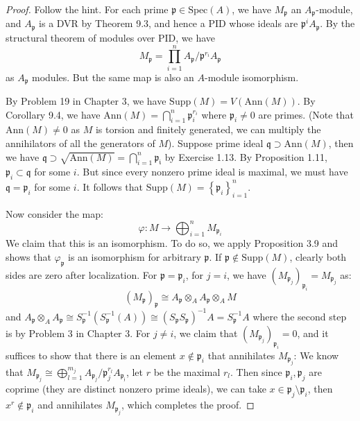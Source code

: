 \documentclass{solution}
\begin{document}
\begin{proof}
    Follow the hint. For each prime $\mathfrak{p} \in \mathrm{Spec}(A)$, we have $M_{\mathfrak{p}}$ an $A_{\mathfrak{p}}$-module, and $A_{\mathfrak{p}}$ is a DVR by Theorem 9.3, and hence a PID whose ideals are $\mathfrak{p}^i A_{\mathfrak{p}}$. By the structural theorem of modules over PID, we have
    $$M_{\mathfrak{p}} = \prod\limits_{i = 1}^{n} A_{\mathfrak{p}} / \mathfrak{p}^{r_i} A_{\mathfrak{p}}$$
    as $A_{\mathfrak{p}}$ modules. But the same map is also an $A$-module isomorphism.

    By Problem 19 in Chapter 3, we have $\mathrm{Supp}(M) = V(\mathrm{Ann}(M))$. By Corollary 9.4, we have $\mathrm{Ann}(M) = \bigcap\limits_{i = 1}^{n} \mathfrak{p}_i^{r_i}$ where $\mathfrak{p}_i \ne 0$ are primes. (Note that $\mathrm{Ann}(M) \ne 0$ as $M$ is torsion and finitely generated, we can multiply the annihilators of all the generators of $M$). Suppose prime ideal $\mathfrak{q} \supset \mathrm{Ann}(M)$, then we have $\mathfrak{q} \supset \sqrt{\mathrm{Ann}(M)} = \bigcap\limits_{i = 1}^{n} \mathfrak{p_i}$ by Exercise 1.13. By Proposition 1.11, $\mathfrak{p}_i \subset \mathfrak{q}$ for some $i$. But since every nonzero prime ideal is maximal, we must have $\mathfrak{q} = \mathfrak{p}_i$ for some $i$. It follows that $\mathrm{Supp}(M) = \left\lbrace \mathfrak{p}_i \right\rbrace_{i = 1}^{n}$.

    Now consider the map:
    $$\varphi: M \rightarrow \bigoplus_{i = 1}^n M_{\mathfrak{p}_i}$$
    We claim that this is an isomorphism. To do so, we apply Proposition 3.9 and shows that $\varphi_{\mathfrak{p}}$ is an isomorphism for arbitrary $\mathfrak{p}$. If $\mathfrak{p} \notin \mathrm{Supp}(M)$, clearly both sides are zero after localization. For $\mathfrak{p} = \mathfrak{p}_i$, for $j = i$, we have $(M_{\mathfrak{p}_j})_{\mathfrak{p}_i} = M_{\mathfrak{p}_j}$ as:
    $$(M_{\mathfrak{p}})_{\mathfrak{p}} \cong A_{\mathfrak{p}} \otimes_A A_{\mathfrak{p}} \otimes_A M$$
    and $A_{\mathfrak{p}} \otimes_A A_{\mathfrak{p}} \cong S_{\mathfrak{p}} ^{-1} (S_{\mathfrak{p}} ^{-1} (A)) \cong (S_{\mathfrak{p}}S_{\mathfrak{p}}) ^{-1} A = S_{\mathfrak{p}}^{-1} A$ where the second step is by Problem 3 in Chapter 3. For $j \ne i$, we claim that $(M_{\mathfrak{p}_j})_{\mathfrak{p}_i} = 0$, and it suffices to show that there is an element $x \notin \mathfrak{p}_i$ that annihilates $M_{\mathfrak{p}_j}$: We know that $M_{\mathfrak{p}_j} \cong \bigoplus_{l = 1}^{m_j} A_{\mathfrak{p}_j} / \mathfrak{p}_j^{r_l} A_{\mathfrak{p_j}}$, let $r$ be the maximal $r_l$. Then since $\mathfrak{p}_i, \mathfrak{p}_j$ are coprime (they are distinct nonzero prime ideals), we can take $x \in \mathfrak{p}_j \setminus \mathfrak{p}_i$, then $x^r \notin \mathfrak{p}_i$ and annihilates $M_{\mathfrak{p}_j}$, which completes the proof.


\end{proof}
\end{document}
